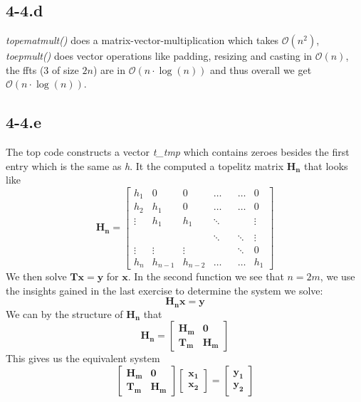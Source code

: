 \documentclass{article}
\begin{document}
\subsection*{4-4.d}
\textit{topematmult()} does a matrix-vector-multiplication which takes $\mathcal{O}\left(n^{2}\right)$, \textit{toepmult()} does vector operations like padding, resizing and casting in $\mathcal{O}\left(n\right)$, the ffts ($3$ of size $2n$) are in $\mathcal{O}\left(n \cdot \log\left(n\right)\right)$ and thus overall we get $\mathcal{O}\left(n \cdot \log\left(n\right)\right)$.
\subsection*{4-4.e}
The top code constructs a vector \textit{t\_tmp} which contains zeroes besides the first entry which is the same as \textit{h}. It the computed a topelitz matrix $\mathbf{H_{n}}$ that looks like
\begin{equation*}
\mathbf{H_{n}} = 
    \begin{bmatrix}
        h_{1} & 0 & 0 & \dots & & \dots &  0\\
        h_{2} & h_{1} & 0 & \dots & 
 &\dots &0\\
        \vdots & h_{1} & h_{1} & \ddots & & & \vdots\\
        \\
       &  &  &\ddots & 
 & \ddots &\vdots\\
        \vdots & \vdots & \vdots &  & &\ddots & 0 \\
        h_{n} & h_{n-1} & h_{n-2}&\dots & & \dots & h_{1}
    \end{bmatrix}
\end{equation*}
We then solve $\mathbf{Tx} = \mathbf{y}$ for $\mathbf{x}$. In the second function we see that $n = 2m$, we use the insights gained in the last exercise to determine the system we solve:
\begin{equation*}
    \mathbf{H_{n}x} = \mathbf{y} 
\end{equation*}
We can by the structure of $\mathbf{H_{n}}$ that
\begin{equation*}
    \mathbf{H_{n}} = \begin{bmatrix}
        \mathbf{H_{m}} & \mathbf{0} \\
        \mathbf{T_{m}} & \mathbf{H_{m}}
    \end{bmatrix}
\end{equation*}
This gives us the equivalent system
\begin{equation*}
    \begin{bmatrix}
        \mathbf{H_{m}} & \mathbf{0} \\
        \mathbf{T_{m}} & \mathbf{H_{m}}
    \end{bmatrix}
    \begin{bmatrix}
        \mathbf{x_{1}} \\
        \mathbf{x_{2}}
    \end{bmatrix}
    = 
    \begin{bmatrix}
        \mathbf{y_{1}} \\
        \mathbf{y_{2}}
    \end{bmatrix}
\end{equation*}
\end{document}
